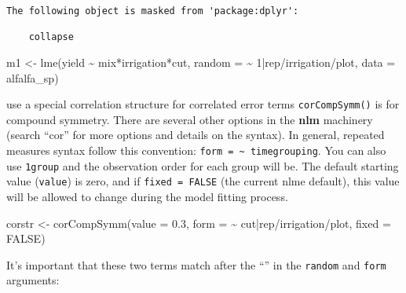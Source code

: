 \documentclass[
  letterpaper,
  DIV=11,
  numbers=noendperiod]{scrreprt}
\newenvironment{Shaded}{\begin{snugshade}}{\end{snugshade}}
\newcommand{\AttributeTok}[1]{\textcolor[rgb]{0.40,0.45,0.13}{#1}}
\newcommand{\ConstantTok}[1]{\textcolor[rgb]{0.56,0.35,0.01}{#1}}
\newcommand{\DecValTok}[1]{\textcolor[rgb]{0.68,0.00,0.00}{#1}}
\newcommand{\FloatTok}[1]{\textcolor[rgb]{0.68,0.00,0.00}{#1}}
\newcommand{\FunctionTok}[1]{\textcolor[rgb]{0.28,0.35,0.67}{#1}}
\newcommand{\NormalTok}[1]{\textcolor[rgb]{0.00,0.23,0.31}{#1}}
\newcommand{\OtherTok}[1]{\textcolor[rgb]{0.00,0.23,0.31}{#1}}
\newcommand{\SpecialCharTok}[1]{\textcolor[rgb]{0.37,0.37,0.37}{#1}}
\begin{document}
\begin{verbatim}
The following object is masked from 'package:dplyr':

    collapse
\end{verbatim}

\begin{Shaded}
\begin{Highlighting}[]
\NormalTok{m1 }\OtherTok{\textless{}{-}} \FunctionTok{lme}\NormalTok{(yield }\SpecialCharTok{\textasciitilde{}}\NormalTok{ mix}\SpecialCharTok{*}\NormalTok{irrigation}\SpecialCharTok{*}\NormalTok{cut,}
          \AttributeTok{random =} \SpecialCharTok{\textasciitilde{}} \DecValTok{1}\SpecialCharTok{|}\NormalTok{rep}\SpecialCharTok{/}\NormalTok{irrigation}\SpecialCharTok{/}\NormalTok{plot,}
          \AttributeTok{data =}\NormalTok{ alfalfa\_sp)}
\end{Highlighting}
\end{Shaded}

use a special correlation structure for correlated error terms
\texttt{corCompSymm()} is for compound symmetry. There are several other
options in the \textbf{nlm} machinery (search ``cor'' for more options
and details on the syntax). In general, repeated measures syntax follow
this convention:
\texttt{form\ =\ \textasciitilde{}\ time\textbar{}grouping}. You can
also use \texttt{1\textbar{}group} and the observation order for each
group will be. The default starting value (\texttt{value}) is zero, and
if \texttt{fixed\ =\ FALSE} (the current nlme default), this value will
be allowed to change during the model fitting process.

\begin{Shaded}
\begin{Highlighting}[]
\NormalTok{corstr }\OtherTok{\textless{}{-}} \FunctionTok{corCompSymm}\NormalTok{(}\AttributeTok{value =} \FloatTok{0.3}\NormalTok{, }
                      \AttributeTok{form =} \SpecialCharTok{\textasciitilde{}}\NormalTok{ cut}\SpecialCharTok{|}\NormalTok{rep}\SpecialCharTok{/}\NormalTok{irrigation}\SpecialCharTok{/}\NormalTok{plot,}
                      \AttributeTok{fixed =} \ConstantTok{FALSE}\NormalTok{)}
\end{Highlighting}
\end{Shaded}

It's important that these two terms match after the ``\textbar{}'' in
the \texttt{random} and \texttt{form} arguments:
\end{document}
